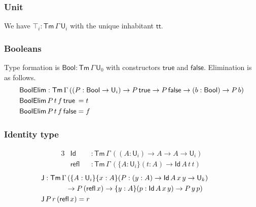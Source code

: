 \documentclass[acmsmall,screen,review,anonymous]{acmart}
\newcommand{\msf}[1]{{\mathsf{#1}}}
\newcommand{\U}{\msf{U}}
\newcommand{\ttt}{\msf{tt}}
\newcommand{\Bool}{\msf{Bool}}
\newcommand{\Tm}{\msf{Tm}}
\newcommand{\true}{\msf{true}}
\newcommand{\false}{\msf{false}}
\newcommand{\BoolElim}{\msf{BoolElim}}
\newcommand{\Id}{\msf{Id}}
\newcommand{\refl}{\msf{refl}}
\newcommand{\J}{\msf{J}}
\begin{document}
\subsubsection{Unit} We have $\top_i : \Tm\,\Gamma\,\U_i$ with the unique inhabitant $\ttt$.

\subsubsection{Booleans} Type formation is $\Bool : \Tm\,\Gamma\,\U_0$ with constructors $\true$ and $\false$. Elimination is as follows.
\begin{alignat*}{3}
  &\BoolElim : \Tm\,\Gamma\,((P : \Bool \to \U_i) \to P\,\true \to P\,\false \to (b : \Bool) \to P\,b)\\
  & \BoolElim\,P\,t\,f\,\true\hspace{0.2em} = t\\
  & \BoolElim\,P\,t\,f\,\false = f
\end{alignat*}

\subsubsection{Identity type}
\begin{alignat*}{3}
  &\Id   &&: \Tm\,\Gamma\,((A : \U_i) \to A \to A \to \U_i)\\
  &\refl &&: \Tm\,\Gamma\,(\{A : \U_i\}(t : A) \to \Id\,A\,t\,t)
\end{alignat*}
\begin{alignat*}{3}
  &\J : \Tm\,\Gamma\,(\{A : \U_i\}\{x : A\}(P : (y : A) \to \Id\,A\,x\,y \to \U_k)\\
  & \hspace{3.5em}\to P\,(\refl\,x) \to \{y : A\}(p : \Id\,A\,x\,y) \to P\,y\,p)&&
  &\\
  &\J\,P\,r\,(\refl\,x) = r
\end{alignat*}
\end{document}
